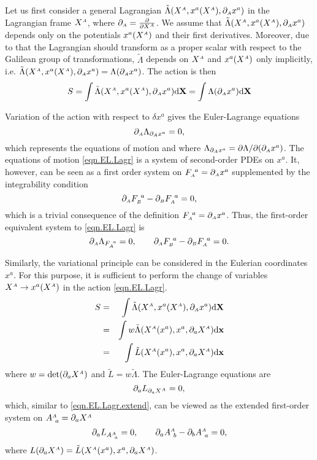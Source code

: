 \documentclass[
10pt, %
a4paper, %
oneside, %
headinclude,footinclude, %
BCOR5mm, %
]{scrartcl}
\newcommand{\xx}{\mathbf{x}}
\newcommand{\XX}{\mathbf{X}}
\newcommand{\dX}{\mathrm{d}\XX}
\newcommand{\dx}{\mathrm{d}\xx}
\newcommand{\sA}{\mathsmaller A}
\newcommand{\sB}{\mathsmaller B}
\newcommand{\pd}{\partial}
\newcommand{\F}[2]{F^{\ #1}_{\mathsmaller#2}}
\newcommand{\A}[2]{A^{\mathsmaller#1}_{\ #2}}
\begin{document}
Let us first consider a general Lagrangian $ \tilde{\Lambda}(X^\sA,x^a(X^\sA),\pd_\sA x^a) $ in the 
Lagrangian 
frame $ X^\sA $, where $ \pd_\sA = \frac{\pd}{\pd X^\sA} $. We assume that $ 
\tilde{\Lambda}(X^\sA,x^a(X^\sA),\pd_\sA x^a) $ depends only on the 
potentials 
$ x^a(X^\sA) $ and their first derivatives. Moreover, due to that the Lagrangian should transform 
as a proper scalar with respect to the Galilean group of transformations, $ \tilde{\Lambda} $ 
depends on $ X^\sA $ and $ x^a(X^\sA) $ 
only implicitly, i.e.
$ \tilde{\Lambda}(X^\sA,x^a(X^\sA),\pd_\sA x^a) = \Lambda(\pd_\sA x^a) $.
 The action is then
\begin{equation}
S = \int \tilde{\Lambda}(X^\sA,x^a(X^\sA),\pd_\sA x^a)\dX = \int \Lambda(\pd_\sA x^a)\dX
\end{equation}

Variation of the action with respect to $ \delta x^a $ gives the Euler-Lagrange equations
\begin{equation}\label{eqn.EL.Lagr}
\pd_\sA \Lambda_{\pd_\sA x^a} = 0,
\end{equation}
which represents the equations of motion and where $ 
\Lambda_{\pd_\sA x^a} = \pd\Lambda/\pd (\pd_\sA x^a)$. The equations of motion \eqref{eqn.EL.Lagr} 
is 
a system of second-order PDEs on $ x^a $. It, however, can be seen as a first order system on $ 
\F{a}{A} = \pd_\sA x^a$ supplemented by the integrability condition 
\begin{equation}\label{eqn.integrability.F}
\pd_\sA \F{a}{B} - \pd_\sB \F{a}{A} = 0,
\end{equation}
which is a trivial consequence of the definition $ \F{a}{A} = \pd_\sA x^a $. Thus, the first-order 
equivalent system to \eqref{eqn.EL.Lagr} is
\begin{equation}\label{eqn.EL.Lagr.extend}
\pd_\sA \Lambda_{\F{a}{A}} = 0, \qquad \pd_\sA \F{a}{B} - \pd_\sB \F{a}{A} = 0.
\end{equation}

Similarly, the variational principle can be considered in the Eulerian coordinates $ x^a $. For 
this 
purpose, it is sufficient to perform the change of variables $ X^\sA \rightarrow x^a(X^\sA) $ in 
the action \eqref{eqn.EL.Lagr}.
\begin{eqnarray}
S &=& \int \tilde{\Lambda}(X^\sA,x^a(X^\sA),\pd_\sA x^a)\dX \nonumber\\
  &=& \int w \tilde{\Lambda}(X^\sA(x^a),x^a,\pd_a X^\sA)\dx \nonumber\\
  &=& \int \tilde{L}(X^\sA(x^a),x^a,\pd_a X^\sA)\dx
\end{eqnarray}
where $ w = \det(\pd_a X^\sA) $ and $ \tilde{L} = w \tilde{\Lambda} $. The Euler-Lagrange equations 
are
\begin{equation}
\pd_a L_{\pd_a X^\sA} = 0,
\end{equation}
which, similar to \eqref{eqn.EL.Lagr.extend}, can be viewed as the extended first-order system on $ 
\A{A}{a} = \pd_a X^\sA$
\begin{equation}
\pd_a L_{\A{A}{a}} = 0, \qquad \pd_a \A{A}{b} - \pd_b \A{A}{a} = 0,
\end{equation}
where $ L(\pd_a X^\sA) = \tilde{L}(X^\sA(x^a),x^a,\pd_a X^\sA) $.
\end{document}
